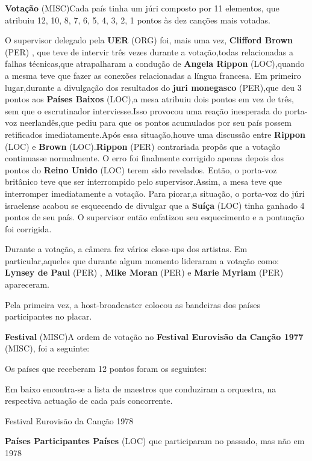 \documentclass[12pt,a4paper]{article}
\begin{document}
\textbf{Votação} (MISC)Cada país tinha um júri composto por 11 elementos, que atribuiu 12, 10, 8, 7, 6, 5, 4, 3, 2, 1 pontos às dez canções mais votadas.

O supervisor delegado pela \textbf{UER} (ORG) foi, mais uma vez, \textbf{Clifford Brown} (PER) , que teve de intervir três vezes durante a votação,todas relacionadas a falhas técnicas,que atrapalharam a condução de \textbf{Angela Rippon} (LOC),quando a mesma teve que fazer as conexões relacionadas a língua francesa. Em primeiro lugar,durante a divulgação dos resultados do \textbf{juri monegasco} (PER),que deu 3 pontos aos \textbf{Países Baixos} (LOC),a mesa atribuiu dois pontos em vez de três, sem que o escrutinador interviesse.Isso provocou uma reação inesperada do porta-voz neerlandês,que pediu para que os pontos acumulados por seu país possem retificados imediatamente.Após essa situação,houve uma discussão entre \textbf{Rippon} (LOC) e \textbf{Brown} (LOC).\textbf{Rippon} (PER) contrariada propôs que a votação continuasse normalmente. O erro foi finalmente corrigido apenas depois dos pontos do \textbf{Reino Unido} (LOC) terem sido revelados. Então, o porta-voz britânico teve que ser interrompido pelo supervisor.Assim, a mesa teve que interromper imediatamente a votação. Para piorar,a situação, o porta-voz do júri israelense acabou se esquecendo de divulgar que a \textbf{Suíça} (LOC) tinha ganhado 4 pontos de seu país. O supervisor então enfatizou seu esquecimento e a pontuação foi corrigida.

Durante a votação, a câmera fez vários close-ups dos artistas. Em particular,aqueles que durante algum momento lideraram a votação como: \textbf{Lynsey de Paul} (PER) , \textbf{Mike Moran} (PER) e \textbf{Marie Myriam} (PER) apareceram.

Pela primeira vez, a host-broadcaster colocou as bandeiras dos países participantes no placar.



\textbf{Festival} (MISC)A ordem de votação no \textbf{Festival Eurovisão da Canção 1977} (MISC), foi a seguinte:

Os países que receberam 12 pontos foram os seguintes:

Em baixo encontra-se a lista de maestros que conduziram a orquestra, na respectiva actuação de cada país concorrente.



Festival Eurovisão da Canção 1978



\textbf{Países Participantes Países} (LOC) que participaram no passado, mas não em 1978
\end{document}
